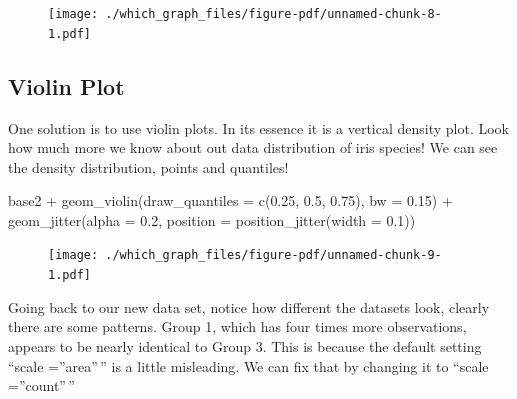 \documentclass[
  letterpaper,
]{book}
\newenvironment{Shaded}{\begin{snugshade}}{\end{snugshade}}
\newcommand{\AttributeTok}[1]{\textcolor[rgb]{0.40,0.45,0.13}{#1}}
\newcommand{\FloatTok}[1]{\textcolor[rgb]{0.68,0.00,0.00}{#1}}
\newcommand{\FunctionTok}[1]{\textcolor[rgb]{0.28,0.35,0.67}{#1}}
\newcommand{\NormalTok}[1]{\textcolor[rgb]{0.00,0.23,0.31}{#1}}
\newcommand{\SpecialCharTok}[1]{\textcolor[rgb]{0.37,0.37,0.37}{#1}}
\begin{document}
\begin{figure}[H]

{\centering \texttt{[image: ./which\_graph\_files/figure-pdf/unnamed-chunk-8-1.pdf]}

}

\end{figure}

\hypertarget{violin-plot}{%
\subsection{Violin Plot}\label{violin-plot}}

One solution is to use violin plots. In its essence it is a vertical
density plot. Look how much more we know about out data distribution of
iris species! We can see the density distribution, points and quantiles!

\begin{Shaded}
\begin{Highlighting}[]
\NormalTok{base2 }\SpecialCharTok{+} \FunctionTok{geom\_violin}\NormalTok{(}\AttributeTok{draw\_quantiles =} \FunctionTok{c}\NormalTok{(}\FloatTok{0.25}\NormalTok{, }\FloatTok{0.5}\NormalTok{, }\FloatTok{0.75}\NormalTok{), }\AttributeTok{bw =} \FloatTok{0.15}\NormalTok{) }\SpecialCharTok{+} \FunctionTok{geom\_jitter}\NormalTok{(}\AttributeTok{alpha =} \FloatTok{0.2}\NormalTok{, }\AttributeTok{position =} \FunctionTok{position\_jitter}\NormalTok{(}\AttributeTok{width =} \FloatTok{0.1}\NormalTok{))}
\end{Highlighting}
\end{Shaded}

\begin{figure}[H]

{\centering \texttt{[image: ./which\_graph\_files/figure-pdf/unnamed-chunk-9-1.pdf]}

}

\end{figure}

Going back to our new data set, notice how different the datasets look,
clearly there are some patterns. Group 1, which has four times more
observations, appears to be nearly identical to Group 3. This is because
the default setting ``scale =''area''\,'' is a little misleading. We can
fix that by changing it to ``scale =''count''\,''
\end{document}
